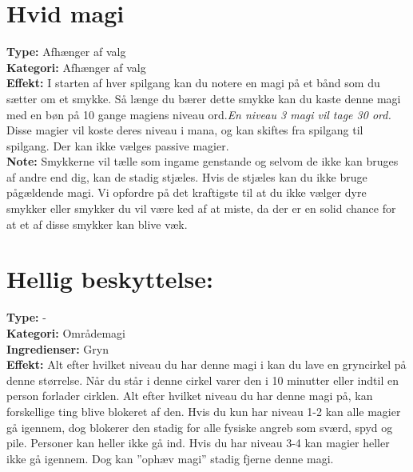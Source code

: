 \section{Hvid magi}
\textbf{Type:} Afhænger af valg\\
\textbf{Kategori:} Afhænger af valg \\
\textbf{Effekt:} I starten af hver spilgang kan du notere en magi på et bånd som du sætter om et smykke. Så længe du bærer dette smykke kan du kaste denne magi med en bøn på 10 gange magiens niveau ord.\textit{En niveau 3 magi vil tage 30 ord.} Disse magier vil koste deres niveau i mana, og kan skiftes fra spilgang til spilgang. Der kan ikke vælges passive magier.\\
\textbf{Note:} Smykkerne vil tælle som ingame genstande og selvom de ikke kan bruges af andre end dig, kan de stadig stjæles. Hvis de stjæles kan du ikke bruge pågældende magi. Vi opfordre på det kraftigste til at du ikke vælger dyre smykker eller smykker du vil være ked af at miste, da der er en solid chance for at et af disse smykker kan blive væk.

\section{Hellig beskyttelse:}
\textbf{Type:} -\\
\textbf{Kategori:} Områdemagi\\
\textbf{Ingredienser:} Gryn\\
\textbf{Effekt:} Alt efter hvilket niveau du har denne magi i kan du lave en gryncirkel på denne størrelse. Når du står i denne cirkel varer den i 10 minutter eller indtil en person forlader cirklen. Alt efter hvilket niveau du har denne magi på, kan forskellige ting blive blokeret af den. Hvis du kun har niveau 1-2 kan alle magier gå igennem, dog blokerer den stadig for alle fysiske angreb som sværd, spyd og pile. Personer kan heller ikke gå ind. Hvis du har niveau 3-4 kan magier heller ikke gå igennem. Dog kan ”ophæv magi” stadig fjerne denne magi.

